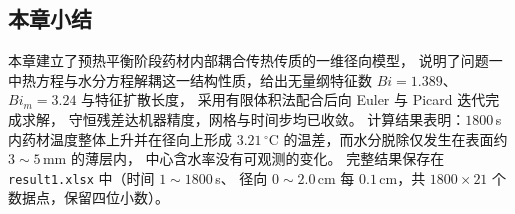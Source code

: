 \documentclass[12pt,a4paper]{ctexart}
\begin{document}
\subsection{本章小结}

本章建立了预热平衡阶段药材内部耦合传热传质的一维径向模型，
说明了问题一中热方程与水分方程解耦这一结构性质，给出无量纲特征数
$Bi=1.389$、$Bi_m=3.24$ 与特征扩散长度，
采用有限体积法配合后向 Euler 与 Picard 迭代完成求解，
守恒残差达机器精度，网格与时间步均已收敛。
计算结果表明：$1800$\,s 内药材温度整体上升并在径向上形成
$3.21\,^\circ$C 的温差，而水分脱除仅发生在表面约 $3\sim5$\,mm 的薄层内，
中心含水率没有可观测的变化。
完整结果保存在 \texttt{result1.xlsx} 中（时间 $1\sim1800$\,s、
径向 $0\sim2.0$\,cm 每 $0.1$\,cm，共 $1800\times21$ 个数据点，保留四位小数）。
\end{document}
